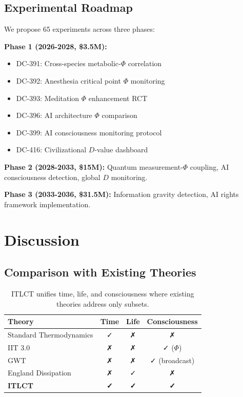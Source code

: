 \documentclass[12pt,a4paper]{article}
\begin{document}
\subsection{Experimental Roadmap}

We propose 65 experiments across three phases:

\textbf{Phase 1 (2026-2028, \$3.5M):}
\begin{itemize}
\item DC-391: Cross-species metabolic-$\Phi$ correlation
\item DC-392: Anesthesia critical point $\Phi$ monitoring
\item DC-393: Meditation $\Phi$ enhancement RCT
\item DC-396: AI architecture $\Phi$ comparison
\item DC-399: AI consciousness monitoring protocol
\item DC-416: Civilizational $D$-value dashboard
\end{itemize}

\textbf{Phase 2 (2028-2033, \$15M):} Quantum measurement-$\Phi$ coupling, AI consciousness detection, global $D$ monitoring.

\textbf{Phase 3 (2033-2036, \$31.5M):} Information gravity detection, AI rights framework implementation.

\section{Discussion}

\subsection{Comparison with Existing Theories}

\begin{table}[h]
\centering
\begin{tabular}{|l|c|c|c|}
\hline
\textbf{Theory} & \textbf{Time} & \textbf{Life} & \textbf{Consciousness} \\
\hline
Standard Thermodynamics & ✓ & ✗ & ✗ \\
IIT 3.0 & ✗ & ✗ & ✓ ($\Phi$) \\
GWT & ✗ & ✗ & ✓ (broadcast) \\
England Dissipation & ✗ & ✓ & ✗ \\
\textbf{ITLCT} & \textbf{✓} & \textbf{✓} & \textbf{✓} \\
\hline
\end{tabular}
\caption{ITLCT unifies time, life, and consciousness where existing theories address only subsets.}
\end{table}
\end{document}
